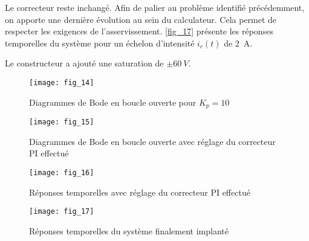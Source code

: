 \begin{multicols}{2}
Le correcteur reste inchangé. Afin de palier au problème identifié précédemment, on apporte une dernière évolution au sein du calculateur. Cela permet de respecter les exigences de l’asservissement. \autoref{fig_17} présente les réponses temporelles du système pour un échelon d’intensité $i_c(t)$ de \SI{2}{A}.

\ifprof
\begin{corrige}
Le constructeur a ajouté une saturation de $\pm \SI{60}{V}$.
\end{corrige}
\else



\begin{figure}[H]
\centering
\texttt{[image: fig\_14]}
\caption{Diagrammes de Bode en boucle ouverte pour $K_p = 10$\label{fig_14}}
\end{figure}


\begin{figure}[H]
\centering
\texttt{[image: fig\_15]}
\caption{Diagrammes de Bode en boucle ouverte avec réglage du correcteur PI effectué \label{fig_15}}
\end{figure}

\begin{figure}[H]
\centering
\texttt{[image: fig\_16]}
\caption{Réponses temporelles avec réglage du correcteur PI effectué \label{fig_16}}
\end{figure}


\begin{figure}[H]
\centering
\texttt{[image: fig\_17]}
\caption{Réponses temporelles du système finalement implanté\label{fig_17}}
\end{figure}

\fi


\ifprof
\else
\end{multicols}
\fi
